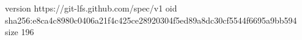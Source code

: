 version https://git-lfs.github.com/spec/v1
oid sha256:e8ca4c8980c0406a21f4c425ce28920304f5ed89a8dc30cf5544f6695a9bb594
size 196
